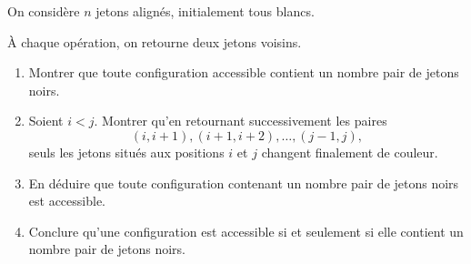 On considère $n$ jetons alignés, initialement tous blancs.

À chaque opération, on retourne deux jetons voisins.
\begin{enumerate}
  \item Montrer que toute configuration accessible contient un nombre pair de
  jetons noirs.
  \item Soient $i < j$. Montrer qu'en retournant successivement les paires
  \[
  (i, i+1), (i+1, i+2), \ldots, (j-1, j),
  \]
  seuls les jetons situés aux positions $i$ et $j$ changent finalement de
  couleur.
  \item En déduire que toute configuration contenant un nombre pair de jetons
  noirs est accessible.
  \item Conclure qu'une configuration est accessible si et seulement si elle
  contient un nombre pair de jetons noirs.
\end{enumerate}
